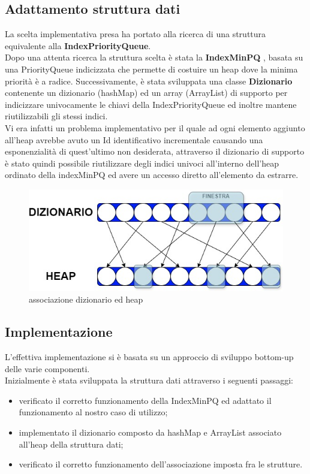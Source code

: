 \subsection{Adattamento struttura dati}
La scelta implementativa presa ha portato alla ricerca di una struttura equivalente alla \textbf{IndexPriorityQueue}.\\
Dopo una attenta ricerca la struttura scelta è stata la \textbf{IndexMinPQ} \cite{princeton}, basata su una PriorityQueue indicizzata che permette di costuire un heap dove la minima priorità è a radice.
Successivamente, è stata sviluppata una classe \textbf{Dizionario} contenente un dizionario (hashMap) ed un array (ArrayList) di supporto per indicizzare univocamente le chiavi della IndexPriorityQueue ed inoltre mantene riutilizzabili gli stessi indici.\\
Vi era infatti un problema implementativo per il quale ad ogni elemento aggiunto all'heap avrebbe avuto un Id identificativo incrementale causando una esponenzialità di quest'ultimo non desiderata, attraverso il dizionario di supporto è stato quindi possibile riutilizzare degli indici univoci all'interno dell'heap ordinato della indexMinPQ ed avere un accesso diretto all'elemento da estrarre.\\
\begin{figure}[htbp]
	\centering
	\includegraphics[scale=0.5]{iterazione3/images/dizionario_heap.jpg}
	\caption{associazione dizionario ed heap\label{fig:dizionario_heap}}
\end{figure}

\subsection{Implementazione}
L'effettiva implementazione si è basata su un approccio di sviluppo bottom-up delle varie componenti. \\
Inizialmente è stata sviluppata la struttura dati attraverso i seguenti passaggi:
\begin{itemize}
    \item verificato il corretto funzionamento della IndexMinPQ ed adattato il funzionamento al nostro caso di utilizzo;
    \item implementato il dizionario composto da hashMap e ArrayList associato all'heap della struttura dati;
    \item verificato il corretto funzionamento dell'associazione imposta fra le strutture.
\end{itemize}

